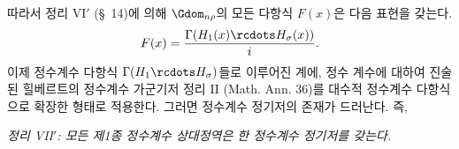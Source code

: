 
따라서 정리 VI$'$ (\S\ 14)에 의해 $\Gdom_{n\rho}$의 모든 다항식 $F(x)$은 다음 표현을 갖는다.
\[
  F(x)=\frac{\Gamma(H_1(x)\rcdots H_\sigma(x))}{i}.
\]
이제 정수계수 다항식 $\Gamma(H_1\rcdots H_\sigma)$들로 이루어진 계에, 정수 계수에 대하여 진술된 힐베르트의 정수계수 가군기저 정리 II (Math. Ann. 36)를 대수적 정수계수 다항식으로 확장한 형태로 적용한다. 그러면 정수계수 정기저의 존재가 드러난다. 즉,

\emph{정리 VII$'$: 모든 제1종 정수계수 상대정역은 한 정수계수 정기저를 갖는다.}
